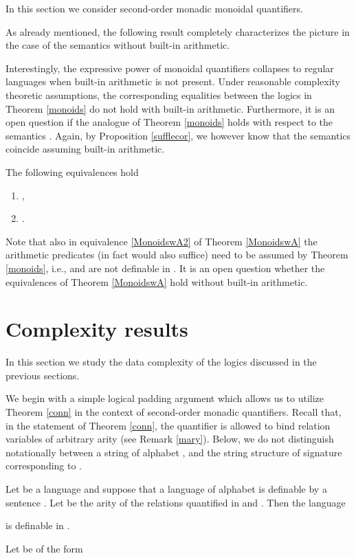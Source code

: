 \documentclass{LMCS}
\begin{document}
\noindent In this section we consider second-order monadic monoidal
quantifiers.

As already mentioned, the following result completely characterizes the picture in the case of the semantics  without built-in arithmetic.
\begin{thm}[\cite{MR1908783}]\label{monoids}

\end{thm}
Interestingly, the expressive power of  monoidal quantifiers collapses to regular languages when  built-in arithmetic is not present. Under reasonable complexity theoretic assumptions,  the corresponding equalities between the logics in Theorem \ref{monoids} do not hold with built-in arithmetic. Furthermore, it is an open question if the analogue of Theorem \ref{monoids} holds with respect  to the semantics . Again, by Proposition \ref{sufflecor}, we however know that the  semantics coincide assuming built-in arithmetic. 

\begin{thm}\label{MonoidswA} The following equivalences hold
\begin{enumerate}[\em(1)]
\item\label{MonoidswA1} ,
\item\label{MonoidswA2} .
\end{enumerate}
\end{thm}
\noindent
Note that also in equivalence \ref{MonoidswA2} of  Theorem \ref{MonoidswA}  the arithmetic predicates (in fact  would also suffice) need to be assumed by Theorem \ref{monoids}, i.e.,  and   are not definable  in .  It is an open question whether the equivalences of Theorem \ref{MonoidswA} hold without built-in arithmetic.


\section{Complexity results}
\noindent In this section we study the data complexity of the logics
discussed in the previous sections.

We begin with a simple logical padding argument which allows us to utilize Theorem \ref{conn} in the context of second-order monadic quantifiers. Recall  that, in the statement of  Theorem \ref{conn}, the  quantifier  is allowed to bind relation variables of arbitrary arity (see Remark \ref{mary}).  Below, we do not distinguish notationally between a string  of alphabet ,  and the string structure of signature  corresponding to .   
\begin{prop}\label{padd}Let  be a language and suppose that a language  of alphabet   is definable by a sentence .
Let  be the arity of the relations quantified in  and . Then the language

is definable in .
\end{prop}
\proof 
Let  be of the form
\end{document}
